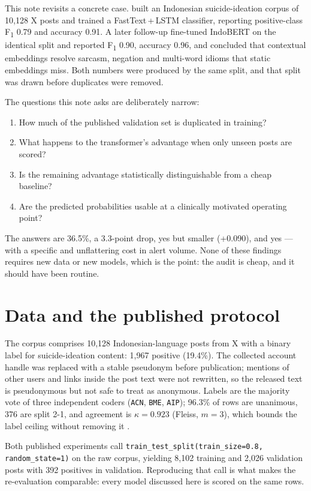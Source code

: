 \documentclass[10pt,a4paper]{article}
\newcommand{\fone}{F\textsubscript{1}}
\begin{document}
This note revisits a concrete case. \citet{thesis} built an Indonesian suicide-ideation corpus of
10{,}128 X posts and trained a FastText\,+\,LSTM classifier, reporting positive-class \fone{} 0.79
and accuracy 0.91. A later follow-up fine-tuned IndoBERT \citep{wilie2020indonlu} on the identical
split and reported \fone{} 0.90, accuracy 0.96, and concluded that contextual embeddings resolve
sarcasm, negation and multi-word idioms that static embeddings miss. Both numbers were produced by
the same split, and that split was drawn before duplicates were removed.

The questions this note asks are deliberately narrow:
\begin{enumerate}
  \item How much of the published validation set is duplicated in training?
  \item What happens to the transformer's advantage when only unseen posts are scored?
  \item Is the remaining advantage statistically distinguishable from a cheap baseline?
  \item Are the predicted probabilities usable at a clinically motivated operating point?
\end{enumerate}

The answers are 36.5\%, a 3.3-point drop, yes but smaller (+0.090), and yes --- with a specific
and unflattering cost in alert volume. None of these findings requires new data or new models,
which is the point: the audit is cheap, and it should have been routine.

\section{Data and the published protocol}

The corpus comprises 10{,}128 Indonesian-language posts from X with a binary label for
suicide-ideation content: 1{,}967 positive (19.4\%). The collected account handle was replaced
with a stable pseudonym before publication; mentions of other users and links inside the post
text were not rewritten, so the released text is pseudonymous but not safe to treat as anonymous.
Labels are the majority vote of three independent coders (\texttt{ACN}, \texttt{BME},
\texttt{AIP}); 96.3\% of rows are unanimous, 376 are split 2-1, and agreement is
$\kappa=0.923$ (Fleiss, $m=3$), which bounds the label ceiling without removing it
\citep{artstein2008agreement}.

Both published experiments call
\texttt{train\_test\_split(train\_size=0.8, random\_state=1)} on the raw corpus, yielding 8{,}102
training and 2{,}026 validation posts with 392 positives in validation. Reproducing that call is
what makes the re-evaluation comparable: every model discussed here is scored on the same rows.
\end{document}
